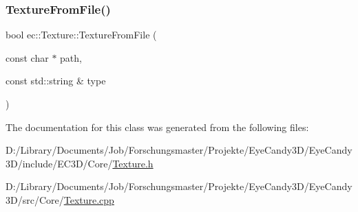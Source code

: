 \mbox{\label{classec_1_1_texture_a4ad8c7559c57f05d993c895ea6820566}} 
\subsubsection{\texorpdfstring{Texture\+From\+File()}{TextureFromFile()}}
{\footnotesize\ttfamily bool ec\+::\+Texture\+::\+Texture\+From\+File (\begin{DoxyParamCaption}\item[{const char $\ast$}]{path,  }\item[{const std\+::string \&}]{type }\end{DoxyParamCaption})}



The documentation for this class was generated from the following files\+:\begin{DoxyCompactItemize}
\item 
D\+:/\+Library/\+Documents/\+Job/\+Forschungsmaster/\+Projekte/\+Eye\+Candy3\+D/\+Eye\+Candy3\+D/include/\+E\+C3\+D/\+Core/\mbox{\hyperlink{_texture_8h}{Texture.\+h}}\item 
D\+:/\+Library/\+Documents/\+Job/\+Forschungsmaster/\+Projekte/\+Eye\+Candy3\+D/\+Eye\+Candy3\+D/src/\+Core/\mbox{\hyperlink{_texture_8cpp}{Texture.\+cpp}}\end{DoxyCompactItemize}
